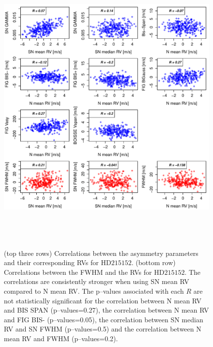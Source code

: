 \documentclass{aa}
\begin{document}
\begin{figure}[htbp]
\begin{center}
\includegraphics[height = 6in]{HD21515_[4]Comparison_para.pdf}  
   \caption{(top three rows) Correlations between the asymmetry parameters and their corresponding RVs for $\text{HD}215152$. 
(bottom row) Correlations between the FWHM and the RVs for $\text{HD}215152$. 
The correlations are consistently stronger when using SN mean RV compared to N mean RV.
The p--values associated with each $R$ are not statistically significant for the correlation between N mean RV and BIS SPAN (p--values=0.27), the correlation between N mean RV and FIG BIS- (p--values=0.05),  the correlation between SN median RV and SN FWHM (p--values=0.5) and the correlation between N mean RV and FWHM (p--values=0.2).
}
   \label{fig:HD215152:corrPlot}
\end{center}
\end{figure}
\end{document}
